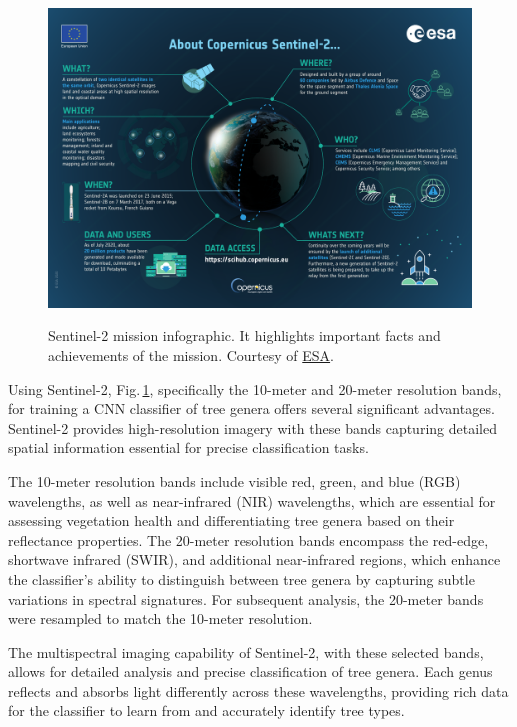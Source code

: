 \begin{figure}[ht]
    \centering
    \href{https://sentinels.copernicus.eu/documents/247904/4180891/Sentinel-2-infographic.pdf}
    {\includegraphics[width=0.9\linewidth]{figures/figures_sentinel/Sentinel-2-infographic.pdf}}
    \caption{Sentinel-2 mission infographic. It highlights important facts and achievements of the mission. Courtesy of \href{https://sentinels.copernicus.eu/web/sentinel/missions/sentinel-2}{ESA}.
    }
    \label{fig:sentinel2_info}
\end{figure}

Using Sentinel-2, Fig.\,\ref{fig:sentinel2_info}, specifically the 10-meter and 20-meter resolution bands, for training a CNN classifier of tree genera offers several significant advantages. Sentinel-2 provides high-resolution imagery with these bands capturing detailed spatial information essential for precise classification tasks.

The 10-meter resolution bands include visible red, green, and blue (RGB) wavelengths, as well as near-infrared (NIR) wavelengths, which are essential for assessing vegetation health and differentiating tree genera based on their reflectance properties. The 20-meter resolution bands encompass the red-edge, shortwave infrared (SWIR), and additional near-infrared regions, which enhance the classifier's ability to distinguish between tree genera by capturing subtle variations in spectral signatures. For subsequent analysis, the 20-meter bands were resampled to match the 10-meter resolution.

The multispectral imaging capability of Sentinel-2, with these selected bands, allows for detailed analysis and precise classification of tree genera. Each genus reflects and absorbs light differently across these wavelengths, providing rich data for the classifier to learn from and accurately identify tree types.

